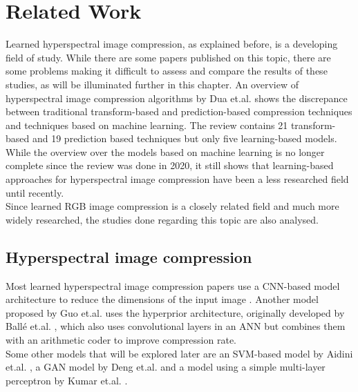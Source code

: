 \chapter{Related Work\label{cha:chapter2}}
Learned hyperspectral image compression, as explained before, is a developing field of study. While there are some papers published on this topic, there are some problems making it difficult to assess and compare the results of these studies, as will be illuminated further in this chapter. An overview of hyperspectral image compression algorithms by Dua et.al. \citep{dua_comprehensive_2020} shows the discrepance between traditional transform-based and prediction-based compression techniques and techniques based on machine learning. The review contains 21 transform-based and 19 prediction based techniques but only five learning-based models. While the overview over the models based on machine learning is no longer complete since the review was done in 2020, it still shows that learning-based approaches for hyperspectral image compression have been a less researched field until recently.\\
Since learned RGB image compression is a closely related field and much more widely researched, the studies done regarding this topic are also analysed.
\section{Hyperspectral image compression \label{sec:ch2hyperspectral}}
Most learned hyperspectral image compression papers use a CNN-based model architecture to reduce the dimensions of the input image \citep{kuester_1d-convolutional_2021}\citep{kuester_transferability_2022}\citep{la_grassa_hyperspectral_2022}. Another model proposed by Guo et.al. \citep{guo_learned_2021} uses the hyperprior architecture, originally developed by Ballé et.al. \citep{balle_end--end_2017}, which also uses convolutional layers in an ANN but combines them with an arithmetic coder to improve compression rate.\\
Some other models that will be explored later are an SVM-based model by Aidini et.al. \citep{aidini_hyperspectral_2019}, a GAN model by Deng et.al. \citep{deng_learning-based_2020} and a model using a simple multi-layer perceptron by Kumar et.al. \citep{leal-taixe_onboard_2019}.
